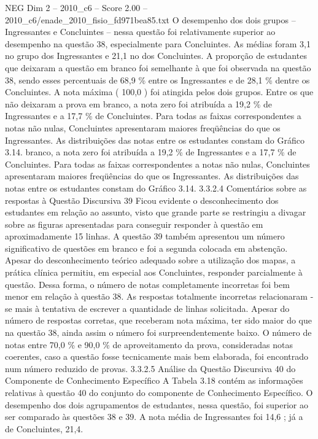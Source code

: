 \begin{textsample}{NEG Dim 2 – 2010\_c6 – Score 2.00 – 2010\_c6/enade\_2010\_fisio\_fd971bea85.txt}
O desempenho dos dois grupos – Ingressantes e Concluintes – nessa questão foi relativamente superior ao desempenho na questão 38, especialmente para Concluintes.
As médias foram 3,1 no grupo dos Ingressantes e 21,1 no dos Concluintes.
A proporção de estudantes que deixaram a questão em branco foi semelhante à que foi observada na questão 38, sendo esses percentuais de 68,9 \% entre os Ingressantes e de 28,1 \% dentre os Concluintes.
A nota máxima ( 100,0 ) foi atingida pelos dois grupos.
Entre os que não deixaram a prova em branco, a nota zero foi atribuída a 19,2 \% de Ingressantes e a 17,7 \% de Concluintes.
Para todas as faixas correspondentes a notas não nulas, Concluintes apresentaram maiores freqüências do que os Ingressantes.
As distribuições das notas entre os estudantes constam do Gráfico 3.14. branco, a nota zero foi atribuída a 19,2 \% de Ingressantes e a 17,7 \% de Concluintes.
Para todas as faixas correspondentes a notas não nulas, Concluintes apresentaram maiores freqüências do que os Ingressantes.
As distribuições das notas entre os estudantes constam do Gráfico 3.14. 3.3.2.4 Comentários sobre as respostas à Questão Discursiva 39 Ficou evidente o desconhecimento dos estudantes em relação ao assunto, visto que grande parte se restringiu a divagar sobre as figuras apresentadas para conseguir responder à questão em aproximadamente 15 linhas.
A questão 39 também apresentou um número significativo de questões em branco e foi a segunda colocada em abstenção.
Apesar do desconhecimento teórico adequado sobre a utilização dos mapas, a prática clínica permitiu, em especial aos Concluintes, responder parcialmente à questão.
Dessa forma, o número de notas completamente incorretas foi bem menor em relação à questão 38.
As respostas totalmente incorretas relacionaram -se mais à tentativa de escrever a quantidade de linhas solicitada.
Apesar do número de respostas corretas, que receberam nota máxima, ter sido maior do que na questão 38, ainda assim o número foi surpreendentemente baixo.
O número de notas entre 70,0 \% e 90,0 \% de aproveitamento da prova, consideradas notas coerentes, caso a questão fosse tecnicamente mais bem elaborada, foi encontrado num número reduzido de provas. 3.3.2.5 Análise da Questão Discursiva 40 do Componente de Conhecimento Específico A Tabela 3.18 contém as informações relativas à questão 40 do conjunto do componente de Conhecimento Específico.
O desempenho dos dois agrupamentos de estudantes, nessa questão, foi superior ao ser comparado às questões 38 e 39.
A nota média de Ingressantes foi 14,6 ; já a de Concluintes, 21,4.

\end{textsample}
